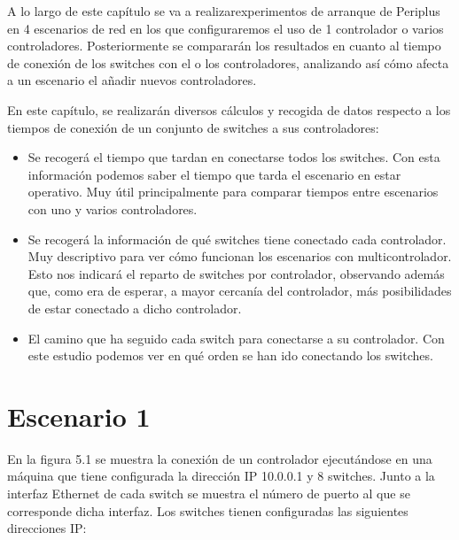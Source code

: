 \documentclass[a4paper, 12pt]{book}
\begin{document}
 	A lo largo de este capítulo se va a realizarexperimentos de arranque de Periplus en 4 escenarios de red en los que configuraremos el uso de 1 controlador o varios controladores. Posteriormente se compararán los resultados en cuanto al tiempo de conexión de los switches con el o los controladores, analizando así cómo afecta a un escenario el añadir nuevos controladores.%
	 
	En este capítulo, se realizarán diversos cálculos y recogida de datos respecto a los tiempos de conexión de un conjunto de switches a sus controladores: 
	
	
	\begin{itemize}
		\item Se recogerá el tiempo que tardan en conectarse todos los switches. Con esta información podemos saber el tiempo que tarda el escenario en estar operativo. Muy útil principalmente para comparar tiempos entre escenarios con uno y varios controladores.
		
		\item Se recogerá la información de qué switches tiene conectado cada controlador. Muy descriptivo para ver cómo funcionan los escenarios con multicontrolador. Esto nos indicará el reparto de switches por controlador, observando además que, como era de esperar, a mayor cercanía del controlador, más posibilidades de estar conectado a dicho controlador.
		
		\item El camino que ha seguido cada switch para conectarse a su controlador. Con este estudio podemos ver en qué orden se han ido conectando los switches.
		
	\end{itemize}
 	
 	\clearpage
 	\section{Escenario 1}
 	En la figura 5.1 se muestra la conexión de un controlador
	ejecutándose en una máquina que tiene configurada la dirección
 	IP 10.0.0.1 y 8 switches. Junto a la interfaz Ethernet de cada switch
 	se muestra el número de puerto al que se corresponde dicha interfaz.
 	Los switches tienen configuradas las siguientes direcciones IP:
 	
\end{document}
